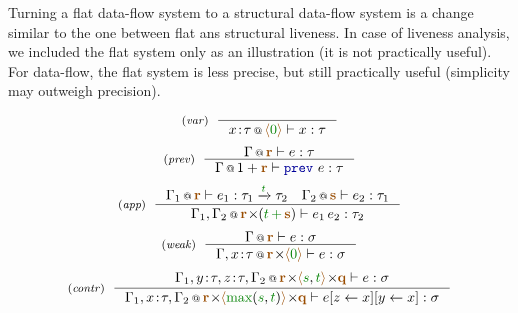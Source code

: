 Turning a flat data-flow system to a structural data-flow system is a change similar to the one
between flat ans structural liveness. In case of liveness analysis, we included the flat system
only as an illustration (it is not practically useful). For data-flow, the flat system is less
precise, but still practically useful (simplicity may outweigh precision).


\begin{figure}[t]
\begin{equation*}
\tyrule{var}{}
  {\coctx{x \!:\! \tau}{\alift{\cclrd{0}}} \vdash x : \tau}
\end{equation*}
\begin{equation*}
\tyrule{prev}
  {\coctx{\Gamma}{\aclrd{\textbf{r}}} \vdash e : \tau}
  {\coctx{\Gamma}{1 + \aclrd{\textbf{r}}} \vdash \kvd{prev}~e : \tau}
\end{equation*}
\begin{equation*}
\tyrule{app}
  { \coctx{\Gamma_1}{\aclrd{\textbf{r}}} \vdash e_1 : \tau_1 \xrightarrow{\cclrd{t}} \tau_2 \quad
    \coctx{\Gamma_2}{\aclrd{\textbf{s}}} \vdash e_2 : \tau_1}
  { \coctx{\Gamma_1, \Gamma_2}{\aclrd{\textbf{r}} \cons (\cclrd{t} \,\cclrd{+}\, \aclrd{\textbf{s}})} \vdash e_1 \, e_2 : \tau_2}
\end{equation*}
\begin{equation*}
\tyrule{weak}
  {\coctx{\Gamma}{ \aclrd{\textbf{r}} } \vdash e : \sigma}
  {\coctx{\Gamma,x \!:\! \tau}{\aclrd{\textbf{r}} \cons \alift{ \cclrd{0} }} \vdash e : \sigma}
\end{equation*}
\begin{equation*}
\tyrule{contr}
  {\coctx{\Gamma_1,y\!:\!\tau,z\!:\!\tau,\Gamma_2}{\aclrd{\textbf{r}} \cons \alift{\cclrd{s},\cclrd{t}} \cons \aclrd{\textbf{q}}} \vdash e : \sigma}
  {\coctx{\Gamma_1,x\!:\!\tau,\Gamma_2}{\aclrd{\textbf{r}} \cons \alift{\cclrd{\textnormal{max}}(\cclrd{s},\cclrd{t})} \cons \aclrd{\textbf{q}}} \vdash \subst{\subst{e}{z}{x}}{y}{x} : \sigma}
\end{equation*}

\label{fig:applications-struct-df}
\vspace{-1em}
\end{figure}


